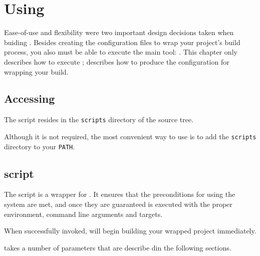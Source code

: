 %
%
%
%
\chapter{Using \lmsbw}

Ease-of-use and flexibility were two important design decisions taken
when buiding \lmsbw.  Besides creating the configuration files to wrap
your project's build process, you also must be able to execute the
main tool: \lmsbw.  This chapter only describes how to execute \lmsbw;
 describes how to produce the configuration for
wrapping your build.

\section{Accessing \lmsbw}

The \lmsbw script resides in the \texttt{scripts} directory of the
\lmsbw source tree.

Although it is not required, the most convenient way to use \lmsbw is
to add the \texttt{scripts} directory to your \texttt{PATH}.

\section{\lmsbw script}

The \lmsbw script is a wrapper for \make.  It ensures that the
preconditions for using the \lmsbw system are met, and once they are
guaranteed \make is executed with the proper environment, command line
arguments and targets.

When successfully invoked, \lmsbw will begin building your wrapped
project immediately.

\lmsbw takes a number of parameters that are describe din the
following sections.

